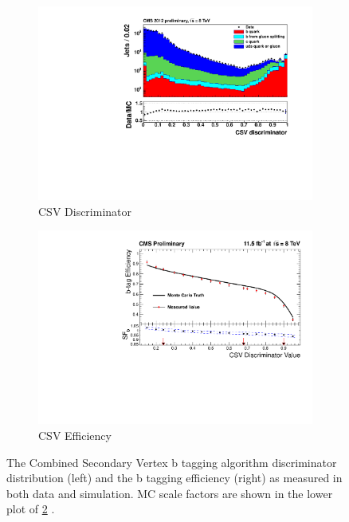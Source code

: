 \begin{figure}[t]
  \centering
  \begin{subfigure}[b]{0.46\textwidth}
    \includegraphics[width=\textwidth]{Figs/btag/csv_discrim.pdf}
    \caption{CSV Discriminator}
    \label{fig:btag_csv_discrim}
  \end{subfigure}
  \begin{subfigure}[b]{0.46\textwidth}
    \includegraphics[width=\textwidth]{Figs/btag/csv_eff.pdf}
    \caption{CSV Efficiency}
    \label{fig:btag_csv_eff}
  \end{subfigure}
  \caption{The Combined Secondary Vertex b tagging algorithm discriminator
  distribution (left) and the b tagging efficiency (right) as measured in both
  data and simulation. MC scale factors are shown in the lower plot of
  \ref{fig:btag_csv_eff} \cite{CMS-PAS-BTV-13-001}.}
  \label{fig:btag_csv}
\end{figure}

